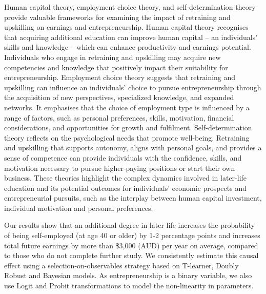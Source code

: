 \documentclass[12pt, a4paper]{article}
\begin{document}
Human capital theory, employment choice theory, and self-determination theory provide valuable frameworks for examining the impact of retraining and upskilling on earnings and entrepreneurship. Human capital theory \citep{becker1964} recognises that acquiring additional education can improve human capital -- an individuals' skills and knowledge -- which can enhance productivity and earnings potential. Individuals who engage in retraining and upskilling may acquire new competencies and knowledge that positively impact their suitability for entrepreneurship. Employment choice theory \citep{heckman1993} suggests that retraining and upskilling can influence an individuals' choice to pursue entrepreneurship through the acquisition of new perspectives, specialized knowledge, and expanded networks. It emphasises that the choice of employment type is influenced by a range of factors, such as personal preferences, skills, motivation, financial considerations, and opportunities for growth and fulfilment. Self-determination theory \citep{deci1985} reflects on the psychological needs that promote well-being. Retraining and upskilling that supports autonomy, aligns with personal goals, and provides a sense of competence can provide individuals with the confidence, skills, and motivation necessary to pursue higher-paying positions or start their own business. These theories highlight the complex dynamics involved in later-life education and its potential outcomes for individuals' economic prospects and entrepreneurial pursuits, such as the interplay between human capital investment, individual motivation and personal preferences. 

Our results show that an additional degree in later life increases the probability of being self-employed (at age 40 or older) by 1-2 percentage points and increases total future earnings by more than \$3,000 (AUD) per year on average, compared to those who do not complete further study. We consistently estimate this causal effect using a selection-on-observables strategy based on T-learner, Doubly Robust and Bayesian models. As entrepreneurship is a binary variable, we also use Logit and Probit transformations to model the non-linearity in parameters. 
\end{document}
